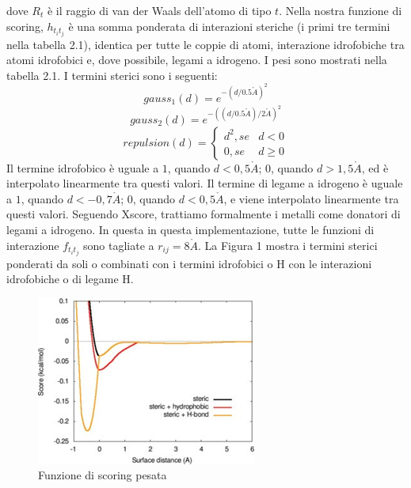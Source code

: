 dove $R_t$ è il raggio di van der Waals dell'atomo di tipo $t$.\newline
Nella nostra funzione di scoring, $h_{t_it_j}$ è una somma ponderata di interazioni steriche (i primi tre termini nella tabella 2.1), identica per tutte le coppie di atomi, interazione idrofobiche tra atomi idrofobici e, dove possibile, legami a idrogeno. I pesi sono mostrati nella tabella 2.1. I termini sterici sono i seguenti:\newline
\begin{equation}
    gauss_1(d)=e^{-(d/0.5\mathring{A})^2}
\end{equation}
\begin{equation}
    gauss_2(d)=e^{-((d/0.5\mathring{A})/2\mathring{A})^2}
\end{equation}
\begin{equation}
    repulsion(d) = \begin{cases}
                        d^2, se & d < 0\\
                        0, se & d \geq 0
                    \end{cases}
\end{equation}\newline
Il termine idrofobico è uguale a $1$, quando $d < 0,5\mathring{A}$; $0$, quando $d > 1,5\mathring{A}$, ed è interpolato linearmente tra questi valori. Il termine di legame a idrogeno è uguale a $1$, quando $d < -0,7\mathring{A}$; $0$, quando $d < 0,5\mathring{A}$, e viene interpolato linearmente tra questi valori. Seguendo Xscore, trattiamo formalmente i metalli come donatori di legami a idrogeno. In questa in questa implementazione, tutte le funzioni di interazione $ f_{t_it_j}$ sono tagliate a $r_{ij} = 8\mathring{A}$.\newline
La Figura 1 mostra i termini sterici ponderati da soli o combinati con i termini idrofobici o H
con le interazioni idrofobiche o di legame H\cite{trott2010autodock}.

\begin{figure}[H]
    \centering
    \includegraphics{immagini/funzioneScoringPesata.png}
    \caption{Funzione di scoring pesata}
    \label{fig:Funzione di scoring pesata}
\end{figure}
